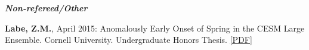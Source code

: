 \documentclass[margin,line,palatino,courier,10pt]{res}
\begin{document}
\begin{resume}
\textit{\textbf{Non-refereed/Other}}
\vspace*{-0.1in}\\
\begin{etaremune}[leftmargin=0in,topsep=0in,parsep=0in]
\item \textbf{Labe, Z.M.}, April 2015: Anomalously Early Onset of Spring in the CESM Large Ensemble. Cornell University. Undergraduate Honors Thesis. \href{http://sites.uci.edu/zlabe/files/2015/11/Labe_Thesis2015.pdf}{[PDF]}
\end{etaremune}

\vspace{-0.1in}
\noindent\textcolor{Cerulean}{\makebox[\linewidth][r]{\rule{\textwidth}{5pt}}}
\vspace{-0.3in} 


\end{resume}
\end{document}
